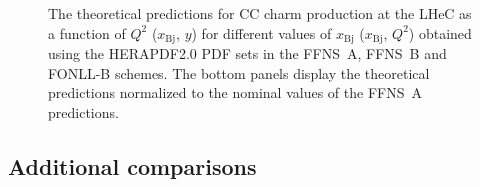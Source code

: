 \documentclass[pdftex,twocolumn,epjc3]{svjour3}          %
\newcommand{\xbj}{\ensuremath{x_{\text{Bj}}}\xspace}
\newcommand{\fonll} {{FONLL-B}\xspace}
\newcommand{\ffns} {{FFNS~A}\xspace}
\newcommand{\ffnsb} {{FFNS~B}\xspace}
\begin{document}
%



%

\begin{figure}
  \centering
  \caption{The theoretical predictions for CC charm production at the
    LHeC as a function of $Q^2$ ($\xbj$, $y$) for different values of
    $\xbj$ ($\xbj$, $Q^2$) obtained using the HERAPDF2.0 PDF sets in
    the \ffns, \ffnsb and \fonll schemes. The bottom panels display the
    theoretical predictions normalized to the nominal values of the
    \ffns predictions.}
  \label{fig:thpred-ff3abfonll}
\end{figure}

%



%
\subsection{Additional comparisons}
\label{sec:compareII}
\end{document}
